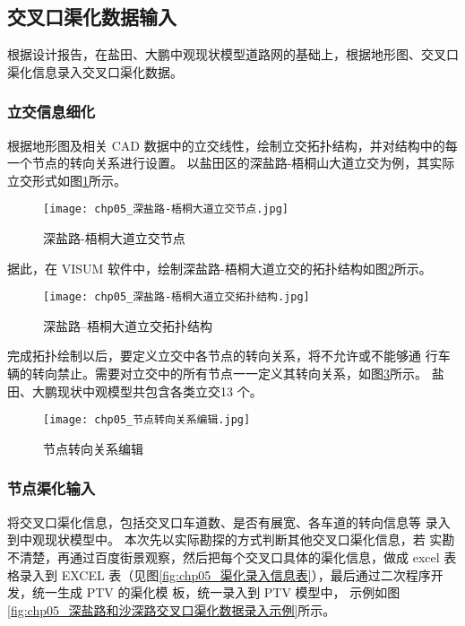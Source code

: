 \subsection{交叉口渠化数据输入}
根据设计报告，在盐田、大鹏中观现状模型道路网的基础上，根据地形图、交叉口渠化信息录入交叉口渠化数据。

\subsubsection{立交信息细化}
根据地形图及相关 CAD 数据中的立交线性，绘制立交拓扑结构，并对结构中的每一个节点的转向关系进行设置。
以盐田区的深盐路-梧桐山大道立交为例，其实际立交形式如图\ref{fig:chp05_深盐路-梧桐大道立交节点}所示。

\begin{figure}[!ht]
  \centering
  \texttt{[image: chp05\_深盐路-梧桐大道立交节点.jpg]}
  \caption{深盐路-梧桐大道立交节点\label{fig:chp05_深盐路-梧桐大道立交节点} }
\end{figure}

据此，在 VISUM 软件中，绘制深盐路-梧桐大道立交的拓扑结构如图\ref{fig:chp05_深盐路-梧桐大道立交拓扑结构}所示。

\begin{figure}[!ht]
  \centering
  \texttt{[image: chp05\_深盐路-梧桐大道立交拓扑结构.jpg]}
  \caption{深盐路--梧桐大道立交拓扑结构\label{fig:chp05_深盐路-梧桐大道立交拓扑结构} }
\end{figure}

完成拓扑绘制以后，要定义立交中各节点的转向关系，将不允许或不能够通
行车辆的转向禁止。需要对立交中的所有节点一一定义其转向关系，如图\ref{fig:chp05_节点转向关系编辑}所示。
盐田、大鹏现状中观模型共包含各类立交13 个。

\begin{figure}[!ht]
  \centering
  \texttt{[image: chp05\_节点转向关系编辑.jpg]}
  \caption{节点转向关系编辑\label{fig:chp05_节点转向关系编辑} }
\end{figure}

\subsubsection{节点渠化输入}
将交叉口渠化信息，包括交叉口车道数、是否有展宽、各车道的转向信息等
录入到中观现状模型中。 本次先以实际勘探的方式判断其他交叉口渠化信息，若
实勘不清楚，再通过百度街景观察，然后把每个交叉口具体的渠化信息，做成
excel 表格录入到 EXCEL 表（见图\ref{fig:chp05_渠化录入信息表}），最后通过二次程序开发，统一生成 PTV 的渠化模
板，统一录入到 PTV 模型中， 示例如图\ref{fig:chp05_深盐路和沙深路交叉口渠化数据录入示例}所示。

